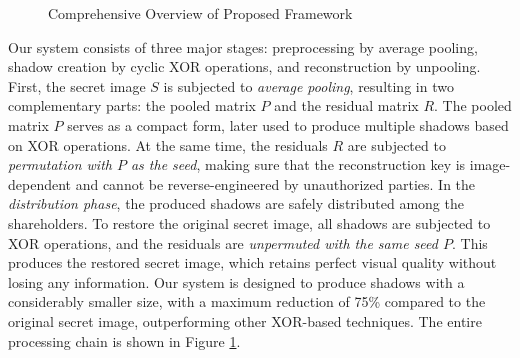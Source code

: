 \begin{figure}[H]
\centering
{}
\caption{Comprehensive Overview of Proposed Framework}
\label{fig:methodology}
\end{figure}


Our system consists of three major stages: preprocessing by average pooling, shadow creation by cyclic XOR operations, and reconstruction by unpooling. First, the secret image $S$ is subjected to \textit{average pooling}, resulting in two complementary parts: the pooled matrix $P$ and the residual matrix $R$. The pooled matrix $P$ serves as a compact form, later used to produce multiple shadows based on XOR operations. At the same time, the residuals $R$ are subjected to \textit{permutation with $P$ as the seed}, making sure that the reconstruction key is image-dependent and cannot be reverse-engineered by unauthorized parties. In the \textit{distribution phase}, the produced shadows are safely distributed among the shareholders. To restore the original secret image, all shadows are subjected to XOR operations, and the residuals are \textit{unpermuted with the same seed $P$}. This produces the restored secret image, which retains perfect visual quality without losing any information. Our system is designed to produce shadows with a considerably smaller size, with a maximum reduction of 75\% compared to the original secret image, outperforming other XOR-based techniques. The entire processing chain is shown in Figure \ref{fig:methodology}.

